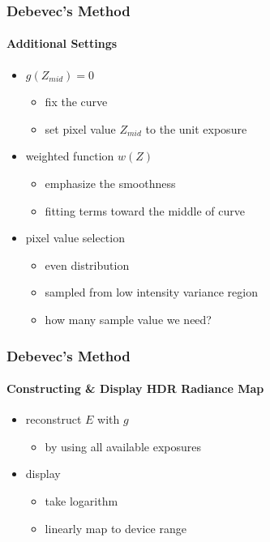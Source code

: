 \documentclass[
	11pt, %
	aspectratio=169, %
]{beamer}
\begin{document}
\begin{frame}
	\frametitle{Debevec's Method}
	\framesubtitle{Additional Settings}

	\begin{itemize}
		\item $g(Z_{mid}) = 0$
		\begin{itemize}
			\item fix the curve
			\item set pixel value $Z_{mid}$ to the unit exposure
		\end{itemize}
		\item weighted function $w(Z)$
		\begin{itemize}
			\item emphasize the smoothness
			\item fitting terms toward the middle of curve
		\end{itemize}
		\item pixel value selection
		\begin{itemize}
			\item even distribution
			\item sampled from low intensity variance region
			\item how many sample value we need?
		\end{itemize}
	\end{itemize}
\end{frame}


\begin{frame}
	\frametitle{Debevec's Method}
	\framesubtitle{Constructing \& Display HDR Radiance Map}

	\begin{itemize}
		\item reconstruct $E$ with $g$
		\begin{itemize}	
			\item by using all available exposures
		\end{itemize}
		\item display
		\begin{itemize}
			\item take logarithm
			\item linearly map to device range
		\end{itemize}
	\end{itemize}
\end{frame}
\end{document}
